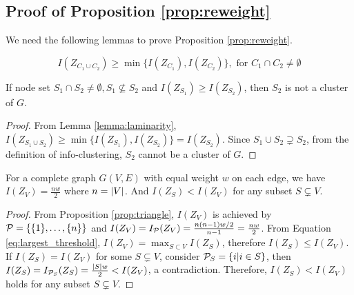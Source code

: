 \subsection{Proof of Proposition \ref{prop:reweight}}
We need the following lemmas to prove Proposition \ref{prop:reweight}.
\begin{lemma}\label{lemma:laminarity}
	\begin{equation}\label{eq:P}
	I(Z_{C_1 \cup C_2}) \geq \min\{ I(Z_{C_1}), I(Z_{C_2})\}, \textrm{ for } C_1\cap C_2 \neq \emptyset
	\end{equation}
\end{lemma}
\begin{lemma}\label{lemma:sub}
	If node set $S_1 \cap S_2 \neq \emptyset, S_1 \not\subseteq S_2$ and $I(Z_{S_1}) \geq I(Z_{S_2})$, then $S_2$ is not a cluster of $G$.
\end{lemma}
\begin{proof}
	From Lemma \ref{lemma:laminarity},
	$I(Z_{S_1\cup S_2}) \geq \min\{I(Z_{S_1}), I(Z_{S_2})\} = I(Z_{S_2})$. Since $S_1 \cup S_2 \supsetneq S_2$, from the definition of info-clustering, $S_2$ cannot be a cluster of $G$.
\end{proof}
\begin{corollary}\label{cor:complete}
	For a complete graph $G(V,E)$ with equal weight $w$ on each edge, we have $I(Z_{V})=\frac{nw}{2}$ where $n=\abs{V}$. And $I(Z_S) < I(Z_V)$ for any subset $S\subsetneq V$.
\end{corollary}
\begin{proof}
	From Proposition \ref{prop:triangle}, $I(Z_{V})$ is achieved by $\P=\{\{1\},\dots,\{n\} \}$ and $I(Z_V) = I_{\P}(Z_V) = \frac{n(n-1)w/2}{n-1} = \frac{nw}{2} $. From Equation \eqref{eq:largest_threshold}, $I(Z_V) = \max_{S\subset V} I(Z_S)$, therefore $I(Z_S) \leq I(Z_V)$. If $I(Z_S) = I(Z_V)$ for some $S\subsetneq V$, consider $\P_S=\{i | i \in S\}$, then $I(Z_S) = I_{\P_S}(Z_S) = \frac{\abs{S}w}{2} < I(Z_V)$, a contradiction. Therefore, $I(Z_S) < I(Z_V)$ holds for any subset $S\subsetneq V$.
\end{proof}
